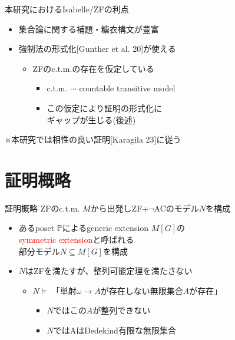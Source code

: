\documentclass[17pt,aspectratio=169]{beamer}
\begin{document}
\begin{frame}{本研究におけるIsabelle/ZFの利点}
    \begin{itemize}
        \item 集合論に関する補題・糖衣構文が豊富
        \item 強制法の形式化{\small [Gunther et al. 20]}が使える
        {\small \begin{itemize}
            \item ZFのc.t.m.の存在を仮定している
            \begin{itemize}
                \item c.t.m. $\cdots$ countable transitive model
                \item この仮定により証明の形式化に\\ギャップが生じる(後述)
            \end{itemize}
        \end{itemize}}
    \end{itemize}
    ※本研究では相性の良い証明{\small [Karagila 23]}に従う
\end{frame}


\section{証明概略}
\begin{frame}{証明概略}
    \vspace{-4pt}
    ZFのc.t.m. $M$から出発しZF+$\neg$ACのモデル$N$を構成
    \vspace{-6pt}
    \begin{itemize}[itemsep=10pt]
        \item あるposet $\mathbb{P}$によるgeneric extension $M[G]$の\\
              \textcolor{red}{symmetric extension}と呼ばれる\\
              部分モデル$N \subseteq M[G]$を構成
        \item $N$はZFを満たすが、整列可能定理を満たさない
        \vspace{6pt}
        {\small \begin{itemize}
            \item $N \vDash $ 「単射$\omega \rightarrow A$が存在しない無限集合$A$が存在」
            \begin{itemize}
                \item $N$ではこの$A$が整列できない
                \item $N$ではAはDedekind有限な無限集合
            \end{itemize}
        \end{itemize}}
    \end{itemize}
\end{frame}
\end{document}
